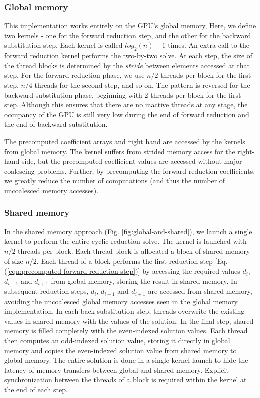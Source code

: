 \documentclass{elsarticle}
\begin{document}
\subsubsection*{Global memory}

This implementation works entirely on the GPU's global memory,
Here, we define two kernels - one for the forward reduction step,
and the other for the backward substitution step.
Each kernel is called $log_2(n)-1$ times.
An extra call to the
forward reduction kernel performs
the two-by-two solve.
At each step,
the size of the thread blocks is determined by the \emph{stride}
between elements accessed at that step.
For the forward reduction phase,
we use $n/2$ threads per block for the first step,
$n/4$ threads for the second step, and so on.
The pattern is reversed for the backward substitution phase,
beginning with 2 threads per block for the first step.
Although this ensures that there are no inactive threads
at any stage,
the occupancy of the GPU is still very low
during the end of forward reduction
and the end of backward substitution.

The precomputed coefficient arrays and right hand
are accessed by the kernels from global memory.
The kernel suffers from
strided memory access for the right-hand side,
but the precomputed coefficient values are accessed
without major coalescing problems.
Further, by precomputing the forward reduction coefficients,
we greatly reduce the number of computations
(and thus the number of uncoalesced memory accesses).

\subsubsection*{Shared memory}

In the shared memory approach (Fig. \ref{fig:global-and-shared}),
we launch a single kernel to perform the entire
cyclic reduction solve.
The kernel is launched with $n/2$ threads per block.
Each thread block is allocated a block of shared memory of size $n/2$.
Each thread of a block performs the first reduction step
[Eq. (\ref{eqn:precomputed-forward-reduction-step})]
by accessing the required values
$d_i$, $d_{i-1}$ and $d_{i+1}$ from global memory,
storing the result in shared memory.
In subsequent reduction steps,
$d_i$, $d_{i-1}$ and $d_{i+1}$
are accessed from shared memory,
avoiding the uncoalesced global memory accesses
seen in the global memory implementation.
In each back substitution step,
threads overwrite the existing values in shared memory
with the values of the solution.
In the final step,
shared memory is filled completely
with the even-indexed solution values.
Each thread then computes an odd-indexed solution value,
storing it directly in global memory
and copies the even-indexed solution value
from shared memory to global memory.
The entire solution is done in a single kernel launch
to hide the latency of
memory transfers between global and shared memory.
Explicit synchronization between the threads of a block
is required within the kernel at the end of each step.
\end{document}
